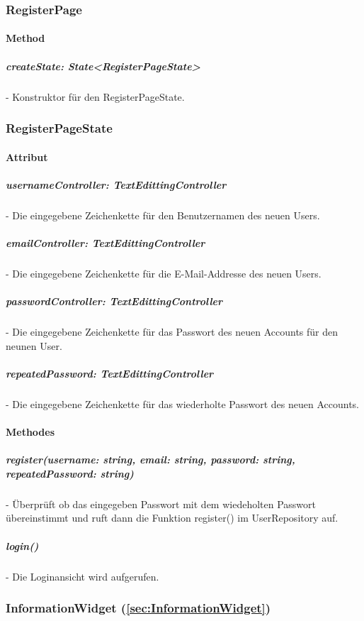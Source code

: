 \documentclass[parskip=full]{scrartcl}
\begin{document}
    \subsubsection{RegisterPage}
        \paragraph*{Method}
            \subparagraph*{createState: State<RegisterPageState>} - Konstruktor für den RegisterPageState.
    
    \subsubsection{RegisterPageState}
        \paragraph*{Attribut}
            \subparagraph*{usernameController: TextEdittingController} - Die eingegebene Zeichenkette für den Benutzernamen des neuen Users.
            \subparagraph*{emailController: TextEdittingController} - Die eingegebene Zeichenkette für die E-Mail-Addresse des neuen Users.
            \subparagraph*{passwordController: TextEdittingController} - Die eingegebene Zeichenkette für das Passwort des neuen Accounts für den neunen User.
            \subparagraph*{repeatedPassword: TextEdittingController} - Die eingegebene Zeichenkette für das wiederholte Passwort des neuen Accounts.
         
        \paragraph*{Methodes}
            \subparagraph*{register(username: string, email: string, password: string, repeatedPassword: string)} - Überprüft ob das eingegeben Passwort mit dem wiedeholten Passwort übereinstimmt und ruft dann die Funktion register() im UserRepository auf.
            \subparagraph*{login()} - Die Loginansicht wird aufgerufen.

    \subsubsection{InformationWidget (\autoref{sec:InformationWidget})}
\end{document}
